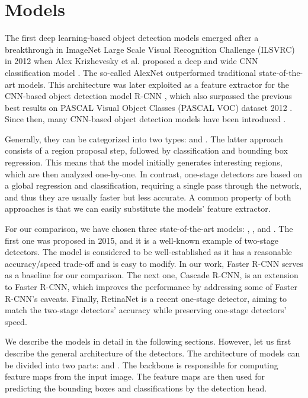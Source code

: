 \chapter{Models}
The first deep learning-based object detection models emerged after a
breakthrough in ImageNet Large Scale Visual Recognition Challenge (ILSVRC)
\cite{ILSVRC15} in 2012 when Alex Krizhevesky et al. proposed a deep
and wide CNN classification model \cite{alexnet}. The so-called AlexNet
outperformed traditional state-of-the-art models.  This architecture was
later exploited as a feature extractor for the CNN-based object detection
model R-CNN \cite{rcnn}, which also surpassed the previous best results on
PASCAL Visual Object Classes (PASCAL VOC) dataset 2012 \cite{voc}. Since then,
many CNN-based object detection models have been introduced \cite{odreview}.

Generally, they can be categorized into two types: 
and . The latter approach consists of a region
proposal step, followed by classification and bounding box regression. This
means that the model initially generates interesting regions, which are then
analyzed one-by-one. In contrast, one-stage detectors are based on a global
regression and classification, requiring a single pass through the network,
and thus they are usually faster but less accurate. A common property of
both approaches is that we can easily substitute the models' feature extractor.

For our comparison, we have chosen three state-of-the-art models:  \cite{fasterrcnn},  \cite{cascadercnn}, and
 \cite{retinanet}. The first one was proposed in 2015, and
it is a well-known example of two-stage detectors. The model is considered
to be well-established as it has a reasonable accuracy/speed trade-off
and is easy to modify. In our work, Faster R-CNN serves as a baseline for
our comparison. The next one, Cascade R-CNN, is an extension to Faster
R-CNN, which improves the performance by addressing some of Faster R-CNN's
caveats. Finally, RetinaNet is a recent one-stage detector, aiming to match
the two-stage detectors' accuracy while preserving one-stage detectors' speed.

We describe the models in detail in the following sections. However, let us
first describe the general architecture of the detectors. The architecture
of models can be divided into two parts:  and . The backbone is responsible for computing feature maps from the input
image. The feature maps are then used for predicting the bounding boxes and
classifications by the detection head.

